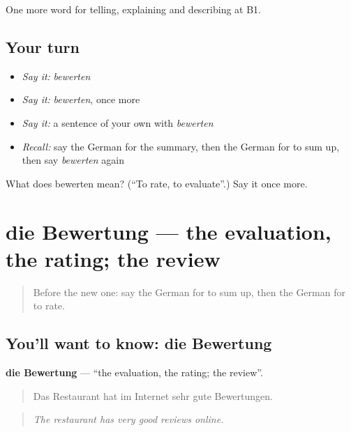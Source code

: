 \begin{grammarlens}[title={What you've built}]
One more word for telling, explaining and describing at B1.
\end{grammarlens}

\subsection*{Your turn}
\begin{itemize}
\raggedright
  \item \emph{Say it:} \emph{bewerten}
  \item \emph{Say it:} \emph{bewerten}, once more
  \item \emph{Say it:} a sentence of your own with \emph{bewerten}
  \item \emph{Recall:} say the German for the summary, then the German for to sum up, then say \emph{bewerten} again
\end{itemize}

\begin{tcolorbox}[breakable,colback=teal!4,colframe=teal!35!black,title={Before you move on}]
What does bewerten mean? (\textquotedblleft{}To rate, to evaluate\textquotedblright{}.) Say it once more.
\end{tcolorbox}
\section[die Bewertung]{die Bewertung — the evaluation, the rating; the review}

\label{lesson:GE-C379-bewertung}



\begin{quote}
Before the new one: say the German for to sum up, then the German for to rate.
\end{quote}

\subsection*{You'll want to know: die Bewertung}
\textbf{die Bewertung} — \textquotedblleft{}the evaluation, the rating; the review\textquotedblright{}.

\begin{quote}
Das Restaurant hat im Internet sehr gute Bewertungen.
\end{quote}

\begin{quote}
\emph{The restaurant has very good reviews online.}
\end{quote}

